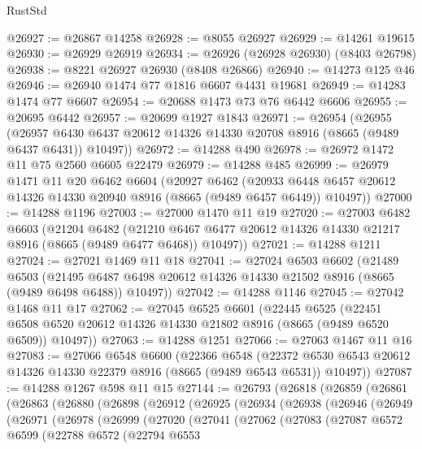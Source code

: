 \begin{lexlean}{RustStd}
\begin{coremodule}
@26927 := @26867 @14258
@26928 := @8055 @26927
@26929 := @14261 @19615
@26930 := @26929 @26919
@26934 := @26926 (@26928 @26930) (@8403 @26798)
@26938 := @8221 @26927 @26930 (@8408 @26866)
@26940 := @14273 @125 @46
@26946 := @26940 @1474 @77 @1816 @6607 @4431 @19681
@26949 := @14283 @1474 @77 @6607
@26954 := @20688 @1473 @73 @76 @6442 @6606
@26955 := @20695 @6442
@26957 := @20699 @1927 @1843
@26971 := @26954
    (@26955
      (@26957 @6430 @6437 @20612 @14326 @14330 @20708 @8916 (@8665 (@9489 @6437 @6431)) @10497))
@26972 := @14288 @490
@26978 := @26972 @1472 @11 @75 @2560 @6605 @22479
@26979 := @14288 @485
@26999 := @26979
    @1471
    @11
    @20
    @6462
    @6604
    (@20927
      @6462
      (@20933 @6448 @6457 @20612 @14326 @14330 @20940 @8916 (@8665 (@9489 @6457 @6449)) @10497))
@27000 := @14288 @1196
@27003 := @27000 @1470 @11 @19
@27020 := @27003
    @6482
    @6603
    (@21204
      @6482
      (@21210 @6467 @6477 @20612 @14326 @14330 @21217 @8916 (@8665 (@9489 @6477 @6468)) @10497))
@27021 := @14288 @1211
@27024 := @27021 @1469 @11 @18
@27041 := @27024
    @6503
    @6602
    (@21489
      @6503
      (@21495 @6487 @6498 @20612 @14326 @14330 @21502 @8916 (@8665 (@9489 @6498 @6488)) @10497))
@27042 := @14288 @1146
@27045 := @27042 @1468 @11 @17
@27062 := @27045
    @6525
    @6601
    (@22445
      @6525
      (@22451 @6508 @6520 @20612 @14326 @14330 @21802 @8916 (@8665 (@9489 @6520 @6509)) @10497))
@27063 := @14288 @1251
@27066 := @27063 @1467 @11 @16
@27083 := @27066
    @6548
    @6600
    (@22366
      @6548
      (@22372 @6530 @6543 @20612 @14326 @14330 @22379 @8916 (@8665 (@9489 @6543 @6531)) @10497))
@27087 := @14288 @1267 @598 @11 @15
@27144 := @26793
    (@26818
      (@26859
        (@26861
          (@26863
            (@26880
              (@26898
                (@26912
                  (@26925
                    (@26934
                      (@26938
                        (@26946
                          (@26949
                            (@26971
                              (@26978
                                (@26999
                                  (@27020
                                    (@27041
                                      (@27062
                                        (@27083
                                          (@27087
                                            @6572
                                            @6599
                                            (@22788
                                              @6572
                                              (@22794
                                                @6553

\end{coremodule}
\end{lexlean}
